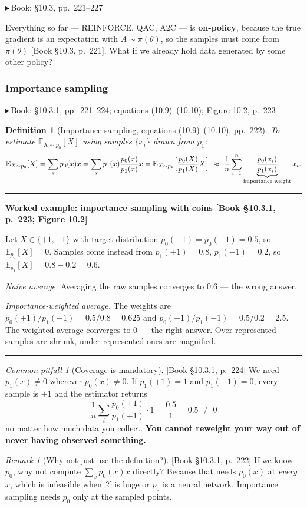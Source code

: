 \documentclass[11pt, letterpaper]{article}
\theoremstyle{runin}
\newtheorem*{definition}{Definition}
\theoremstyle{runinplain}
\theoremstyle{remark}
\newtheorem*{remark}{Remark}
\newtheorem*{warning}{Common pitfall}
\newcommand{\E}{\mathbb{E}}
\newcommand{\bk}[1]{{\color{bookblue}\small$\blacktriangleright$\,\textsf{Book: #1}}}
\newcommand{\bkin}[1]{{\color{bookblue}\small[\textsf{Book #1}]}}
\newenvironment{worked}[1]
  {\par\medskip\noindent\rule{\textwidth}{0.4pt}\par\nobreak\vspace{0.3em}
   \noindent\textbf{Worked example: #1}\par\nobreak\vspace{0.2em}\small}
  {\par\nobreak\vspace{0.3em}\noindent\rule{\textwidth}{0.4pt}\par\medskip}
\begin{document}
\bk{\S10.3, pp.~221--227}

Everything so far --- REINFORCE, QAC, A2C --- is \textbf{on-policy}, because the true
gradient is an expectation with $A\sim\pi(\theta)$, so the samples must come from
$\pi(\theta)$ \bkin{\S10.3, p.~221}. What if we already hold data generated by some
other policy?

\subsubsection{Importance sampling}

\bk{\S10.3.1, pp.~221--224; equations (10.9)--(10.10); Figure 10.2, p.~223}

\begin{definition}[Importance sampling, equations (10.9)--(10.10), pp.~222]
To estimate $\E_{X\sim p_0}[X]$ using samples $\{x_i\}$ drawn from $p_1$:
\[
  \E_{X\sim p_0}[X]=\sum_x p_0(x)x=\sum_x p_1(x)\frac{p_0(x)}{p_1(x)}x
  =\E_{X\sim p_1}\Bigl[\frac{p_0(X)}{p_1(X)}X\Bigr]
  \ \approx\ \frac1n\sum_{i=1}^n\underbrace{\frac{p_0(x_i)}{p_1(x_i)}}_{\text{importance weight}}x_i .
\]
\end{definition}

\begin{worked}{importance sampling with coins \bkin{\S10.3.1, p.~223; Figure 10.2}}
Let $X\in\{+1,-1\}$ with target distribution
$p_0(+1)=p_0(-1)=0.5$, so $\E_{p_0}[X]=0$. Samples come instead from
$p_1(+1)=0.8$, $p_1(-1)=0.2$, so $\E_{p_1}[X]=0.8-0.2=0.6$.

\emph{Naive average.} Averaging the raw samples converges to $0.6$ --- the wrong
answer.

\emph{Importance-weighted average.} The weights are
$p_0(+1)/p_1(+1)=0.5/0.8=0.625$ and $p_0(-1)/p_1(-1)=0.5/0.2=2.5$. The weighted
average converges to $0$ --- the right answer. Over-represented samples are shrunk,
under-represented ones are magnified.
\end{worked}

\begin{warning}[Coverage is mandatory]
\bkin{\S10.3.1, p.~224} We need $p_1(x)\neq0$ wherever $p_0(x)\neq0$. If
$p_1(+1)=1$ and $p_1(-1)=0$, every sample is $+1$ and the estimator returns
\[
  \frac1n\sum_i\frac{p_0(+1)}{p_1(+1)}\cdot 1=\frac{0.5}{1}=0.5\ \neq\ 0
\]
no matter how much data you collect. \textbf{You cannot reweight your way out of
never having observed something.}
\end{warning}

\begin{remark}[Why not just use the definition?]
\bkin{\S10.3.1, p.~222} If we know $p_0$, why not compute
$\sum_xp_0(x)x$ directly? Because that needs $p_0(x)$ at \emph{every} $x$, which is
infeasible when $\mathcal X$ is huge or $p_0$ is a neural network. Importance
sampling needs $p_0$ only at the sampled points.
\end{remark}
\end{document}

